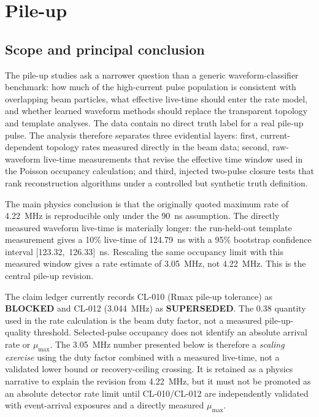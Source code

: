 \chapter{Pile-up}
\label{chap:pileup}

\section{Scope and principal conclusion}
\label{sec:pileup_scope}

The pile-up studies ask a narrower question than a generic waveform-classifier
benchmark: how much of the high-current pulse population is consistent with
overlapping beam particles, what effective live-time should enter the rate
model, and whether learned waveform methods should replace the transparent
topology and template analyses.  The data contain no direct truth label for a
real pile-up pulse.  The analysis therefore separates three evidential layers:
first, current-dependent topology rates measured directly in the beam data;
second, raw-waveform live-time measurements that revise the effective time
window used in the Poisson occupancy calculation; and third, injected
two-pulse closure tests that rank reconstruction algorithms under a controlled
but synthetic truth definition.

The main physics conclusion is that the originally quoted maximum rate of
4.22~MHz is reproducible only under the 90~ns assumption.  The directly
measured waveform live-time is materially longer: the run-held-out template
measurement gives a 10\% live-time of 124.79~ns with a 95\% bootstrap
confidence interval [123.32,~126.33]~ns.  Rescaling the same occupancy limit
with this measured window gives a rate estimate of 3.05~MHz, not 4.22~MHz.
This is the central pile-up revision.

\begin{admonition}
The claim ledger currently records CL-010 (Rmax pile-up tolerance) as
\textbf{BLOCKED} and CL-012 (3.044~MHz) as \textbf{SUPERSEDED}.  The
0.38 quantity used in the rate calculation is the beam duty factor, not a
measured pile-up-quality threshold.  Selected-pulse occupancy does not
identify an absolute arrival rate or $\mu_{\max}$.  The 3.05~MHz number
presented below is therefore a \emph{scaling exercise} using the duty factor
combined with a measured live-time, not a validated lower bound or
recovery-ceiling crossing.  It is retained as a physics narrative to explain
the revision from 4.22~MHz, but it must not be promoted as an absolute
detector rate limit until CL-010/CL-012 are independently validated with
event-arrival exposures and a directly measured $\mu_{\max}$.
\end{admonition}

